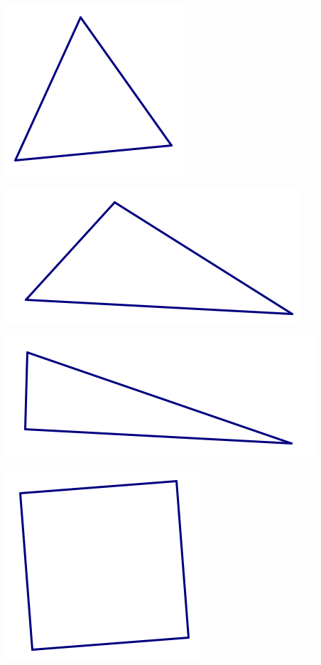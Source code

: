 \begin{center}
\includegraphics[scale=0.95]{eqtri}

\includegraphics[scale=0.95]{scalenetri1}

\includegraphics[scale=0.95]{scalenetri2}

\includegraphics[scale=0.85]{square3}


\end{center}
